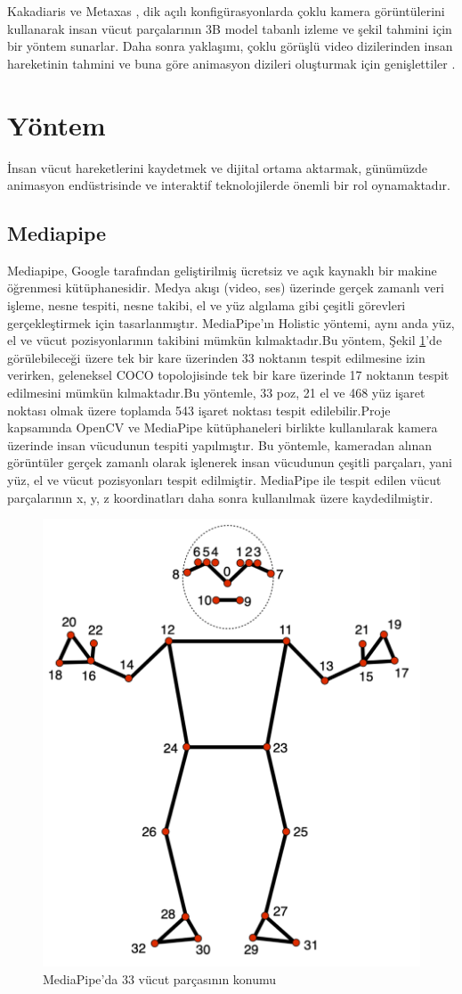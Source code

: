 \documentclass[12pt, a4paper]{article}
\begin{document}
Kakadiaris ve Metaxas \cite{desmarais2021review} , dik açılı konfigürasyonlarda çoklu kamera görüntülerini kullanarak insan vücut parçalarının 3B model tabanlı izleme ve şekil tahmini için bir yöntem sunarlar. Daha sonra yaklaşımı, çoklu görüşlü video dizilerinden insan hareketinin tahmini ve buna göre animasyon dizileri oluşturmak için genişlettiler . 

\newpage
\section{Yöntem}
İnsan vücut hareketlerini kaydetmek ve dijital ortama aktarmak, günümüzde animasyon endüstrisinde ve interaktif teknolojilerde önemli bir rol oynamaktadır.
\subsection{Mediapipe}
Mediapipe, Google tarafından geliştirilmiş ücretsiz ve açık kaynaklı bir makine öğrenmesi kütüphanesidir.\cite{benefits}  Medya akışı (video, ses) üzerinde gerçek zamanlı veri işleme, nesne tespiti, nesne takibi, el ve yüz algılama gibi çeşitli görevleri gerçekleştirmek için tasarlanmıştır.\cite{chatgpt} MediaPipe'ın Holistic yöntemi, aynı anda yüz, el ve vücut pozisyonlarının  takibini mümkün kılmaktadır.Bu yöntem, Şekil \ref{fig:mesh1}'de görülebileceği üzere tek bir kare üzerinden 33 noktanın tespit edilmesine izin verirken, geleneksel COCO topolojisinde tek bir kare üzerinde 17 noktanın tespit edilmesini mümkün kılmaktadır.Bu yöntemle, 33 poz, 21 el ve 468 yüz işaret noktası olmak üzere toplamda 543 işaret noktası tespit edilebilir.Proje kapsamında OpenCV ve MediaPipe kütüphaneleri birlikte kullanılarak kamera üzerinde insan vücudunun tespiti yapılmıştır. Bu yöntemle, kameradan alınan görüntüler gerçek zamanlı olarak işlenerek insan vücudunun çeşitli parçaları, yani yüz, el ve vücut pozisyonları tespit edilmiştir. MediaPipe ile tespit edilen vücut parçalarının x, y, z koordinatları daha sonra kullanılmak üzere kaydedilmiştir.

\begin{figure}[h]
	\centering
	\includegraphics[width= 8 cm , height= 6 cm]{pose_landmarks_index.png}
	\caption{MediaPipe'da 33 vücut parçasının konumu \cite{benefits}}
	\label{fig:mesh1}
\end{figure}
\end{document}
